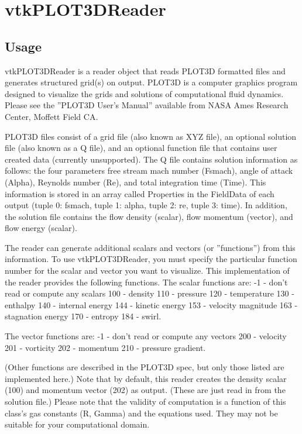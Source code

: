 \section{vtkPLOT3DReader}

\subsection{Usage}

 vtkPLOT3DReader is a reader object that reads PLOT3D formatted files and 
 generates structured grid(s) on output. PLOT3D is a computer graphics 
 program designed to visualize the grids and solutions of computational 
 fluid dynamics. Please see the ''PLOT3D User's Manual'' available from 
 NASA Ames Research Center, Moffett Field CA.

 PLOT3D files consist of a grid file (also known as XYZ file), an 
 optional solution file (also known as a Q file), and an optional function 
 file that contains user created data (currently unsupported). The Q file 
 contains solution  information as follows: the four parameters free stream 
 mach number (Fsmach), angle of attack (Alpha), Reynolds number (Re), and 
 total integration time (Time). This information is stored in an array
 called Properties in the FieldData of each output (tuple 0: fsmach, tuple 1:
 alpha, tuple 2: re, tuple 3: time). In addition, the solution file contains 
 the flow density (scalar), flow momentum (vector), and flow energy (scalar).

 The reader can generate additional scalars and vectors (or ''functions'')
 from this information. To use vtkPLOT3DReader, you must specify the 
 particular function number for the scalar and vector you want to visualize.
 This implementation of the reader provides the following functions. The
 scalar functions are:
    -1  - don't read or compute any scalars
    100 - density
    110 - pressure
    120 - temperature
    130 - enthalpy
    140 - internal energy
    144 - kinetic energy
    153 - velocity magnitude
    163 - stagnation energy
    170 - entropy
    184 - swirl.

 The vector functions are:
    -1  - don't read or compute any vectors
    200 - velocity
    201 - vorticity
    202 - momentum
    210 - pressure gradient.

 (Other functions are described in the PLOT3D spec, but only those listed are
 implemented here.) Note that by default, this reader creates the density 
 scalar (100) and momentum vector (202) as output. (These are just read in
 from the solution file.) Please note that the validity of computation is
 a function of this class's gas constants (R, Gamma) and the equations used.
 They may not be suitable for your computational domain.

